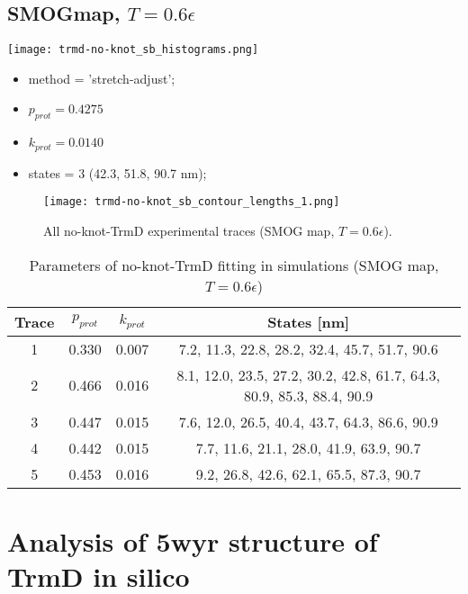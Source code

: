 \subsection{SMOGmap, $T=0.6\epsilon$}
\label{subsec:no-knot-trmd-sb}
\begin{minipage}[c]{0.7\textwidth}
    \texttt{[image: trmd-no-knot\_sb\_histograms.png]}
\end{minipage}
\hfill
\begin{minipage}[c]{0.45\textwidth}
    \begin{itemize}
        \item method = 'stretch-adjust';
        \item $p_{prot}=0.4275$
        \item $k_{prot}=0.0140$
        \item states = 3 (42.3, 51.8, 90.7 nm);
    \end{itemize}
\end{minipage}

\begin{figure}
    \centering
    \texttt{[image: trmd-no-knot\_sb\_contour\_lengths\_1.png]}
    \caption{All no-knot-TrmD experimental traces (SMOG map, $T=0.6\epsilon$).}
    \label{fig:no-knot-trmd-sb-cl1}
\end{figure}

\begin{table}
    \tiny
    \centering
    \caption{Parameters of no-knot-TrmD fitting in simulations (SMOG map, $T=0.6\epsilon$)}
    \label{tab:no-knot-trmd-sb-parameters}
    \begin{tabular}{c|c|c|c}
        \textbf{Trace} & \textbf{$p_{prot}$} & \textbf{$k_{prot}$} & \textbf{States [nm]}\\\hline
        1 & 0.330 & 0.007 & 7.2, 11.3, 22.8, 28.2, 32.4, 45.7, 51.7, 90.6\\
        2 & 0.466 & 0.016 & 8.1, 12.0, 23.5, 27.2, 30.2, 42.8, 61.7, 64.3, 80.9, 85.3, 88.4, 90.9\\
        3 & 0.447 & 0.015 & 7.6, 12.0, 26.5, 40.4, 43.7, 64.3, 86.6, 90.9\\
        4 & 0.442 & 0.015 & 7.7, 11.6, 21.1, 28.0, 41.9, 63.9, 90.7\\
        5 & 0.453 & 0.016 & 9.2, 26.8, 42.6, 62.1, 65.5, 87.3, 90.7\\
    \end{tabular}
\end{table}

\section{Analysis of 5wyr structure of TrmD in silico}
\label{sec:fit-details-5wyr-theory}
